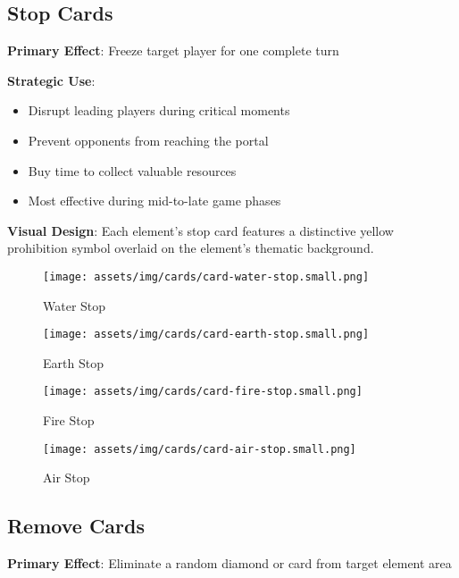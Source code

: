 \documentclass[12pt,a4paper]{article}
\begin{document}
\subsection{Stop Cards}
\textbf{Primary Effect}: Freeze target player for one complete turn

\textbf{Strategic Use}:
\begin{itemize}
    \item Disrupt leading players during critical moments
    \item Prevent opponents from reaching the portal
    \item Buy time to collect valuable resources
    \item Most effective during mid-to-late game phases
\end{itemize}

\textbf{Visual Design}: Each element's stop card features a distinctive yellow prohibition symbol overlaid on the element's thematic background.

\begin{figure}[h]
\centering
\begin{minipage}{0.2\textwidth}
    \centering
    \texttt{[image: assets/img/cards/card-water-stop.small.png]}
    \caption*{\textcolor{waterblue}{Water Stop}}
\end{minipage}
\hfill
\begin{minipage}{0.2\textwidth}
    \centering
    \texttt{[image: assets/img/cards/card-earth-stop.small.png]}
    \caption*{\textcolor{earthgreen}{Earth Stop}}
\end{minipage}
\hfill
\begin{minipage}{0.2\textwidth}
    \centering
    \texttt{[image: assets/img/cards/card-fire-stop.small.png]}
    \caption*{\textcolor{firered}{Fire Stop}}
\end{minipage}
\hfill
\begin{minipage}{0.2\textwidth}
    \centering
    \texttt{[image: assets/img/cards/card-air-stop.small.png]}
    \caption*{\textcolor{airyellow}{Air Stop}}
\end{minipage}
\end{figure}

\subsection{Remove Cards}
\textbf{Primary Effect}: Eliminate a random diamond or card from target element area
\end{document}

